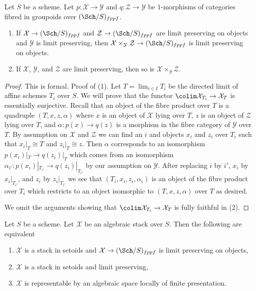 \begin{lemma}
\label{lemma-fibre-product-limit-preserving}
Let $S$ be a scheme. Let $p : \mathcal{X} \to \mathcal{Y}$ and
$q : \mathcal{Z} \to \mathcal{Y}$ be $1$-morphisms of categories
fibred in groupoids over $(\Sch/S)_{fppf}$.
\begin{enumerate}
\item If $\mathcal{X} \to (\Sch/S)_{fppf}$ and
$\mathcal{Z} \to (\Sch/S)_{fppf}$ are limit preserving on objects and
$\mathcal{Y}$ is limit preserving, then
$\mathcal{X} \times_\mathcal{Y} \mathcal{Z} \to (\Sch/S)_{fppf}$ is
limit preserving on objects.
\item If $\mathcal{X}$, $\mathcal{Y}$,
and $\mathcal{Z}$ are limit preserving, then so
is $\mathcal{X} \times_\mathcal{Y} \mathcal{Z}$.
\end{enumerate}
\end{lemma}

\begin{proof}
This is formal. Proof of (1). Let $T = \lim_{i \in I} T_i$ be the directed
limit of affine schemes $T_i$ over $S$. We will prove that the functor
$\colim \mathcal{X}_{T_i} \to \mathcal{X}_T$ is essentially surjective.
Recall that an object of the fibre product over $T$ is a quadruple
$(T, x, z, \alpha)$ where $x$ is an object of $\mathcal{X}$ lying over $T$,
$z$ is an object of $\mathcal{Z}$ lying over $T$, and
$\alpha : p(x) \to q(z)$ is a morphism in the fibre category of
$\mathcal{Y}$ over $T$. By assumption on $\mathcal{X}$ and $\mathcal{Z}$
we can find an $i$ and objects $x_i$ and $z_i$ over $T_i$ such that
$x_i|_T \cong T$ and $z_i|_T \cong z$. Then $\alpha$ corresponds to
an isomorphism $p(x_i)|_T \to q(z_i)|_T$ which comes from an isomorphism
$\alpha_{i'} : p(x_i)|_{T_{i'}} \to q(z_i)|_{T_{i'}}$ by our assumption on
$\mathcal{Y}$. After replacing $i$ by $i'$, $x_i$ by $x_i|_{T_{i'}}$, and
$z_i$ by $z_i|_{T_{i'}}$ we see that $(T_i, x_i, z_i, \alpha_i)$
is an object of the fibre product over $T_i$ which restricts to
an object isomorphic to $(T, x, z, \alpha)$ over $T$ as desired.

\medskip\noindent
We omit the arguments showing that $\colim \mathcal{X}_{T_i} \to \mathcal{X}_T$
is fully faithful in (2).
\end{proof}

\begin{lemma}
\label{lemma-limit-preserving-algebraic-space}
Let $S$ be a scheme. Let $\mathcal{X}$ be an algebraic stack over $S$.
Then the following are equivalent
\begin{enumerate}
\item $\mathcal{X}$ is a stack in setoids and
$\mathcal{X} \to (\Sch/S)_{fppf}$ is limit preserving on objects,
\item $\mathcal{X}$ is a stack in setoids and limit preserving,
\item $\mathcal{X}$ is representable by an algebraic space
locally of finite presentation.
\end{enumerate}
\end{lemma}

